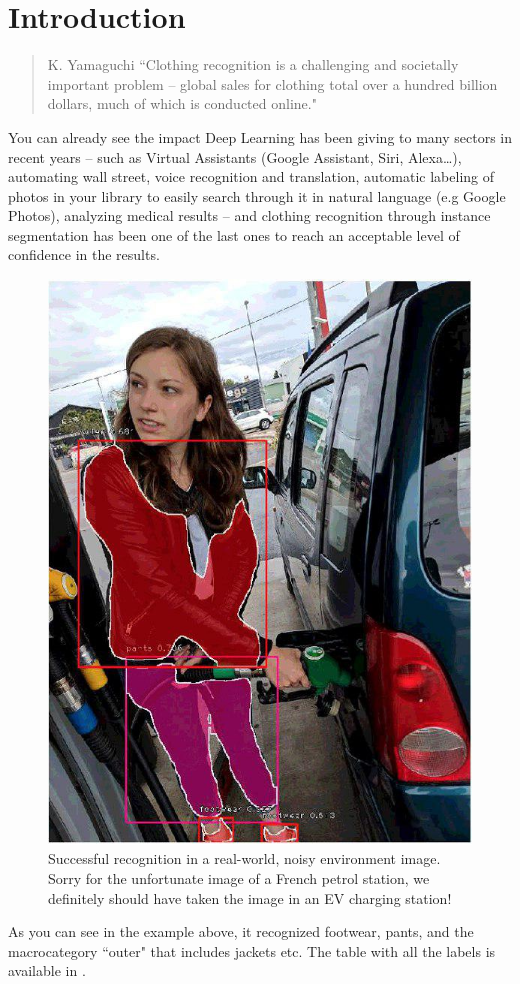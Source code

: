 \chapter*{Introduction}


\begin{quote}{K. Yamaguchi}
	“Clothing recognition is a challenging and societally important problem – global sales for clothing total over a hundred billion dollars, much of which is conducted online." \cite{yamaguchi2013paper}
\end{quote}

You can already see the impact Deep Learning has been giving to many sectors in recent years -- such as Virtual Assistants (Google Assistant, Siri, Alexa\dots), automating wall street, voice recognition and translation, automatic labeling of photos in your library to easily search through it in natural language (e.g Google Photos), analyzing medical results -- and clothing recognition through instance segmentation has been one of the last ones to reach an acceptable level of confidence in the results.

\begin{figure}[H]
	\centering
	\includegraphics[width=.5\linewidth]{images/difficultscenario.jpg}
	\caption{Successful recognition in a real-world, noisy environment image. Sorry for the unfortunate image of a French petrol station, we definitely should have taken the image in an EV charging station!}
\end{figure}

As you can see in the example above, it recognized footwear, pants, and the macrocategory “outer" that includes jackets etc. The table with all the labels is available in .

